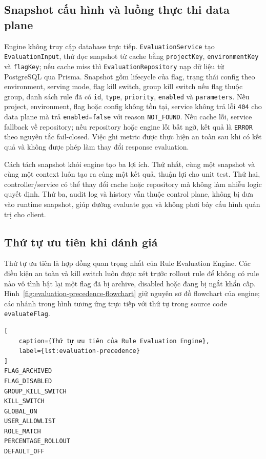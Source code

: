 \subsection{Snapshot cấu hình và luồng thực thi data plane}

Engine không truy cập database trực tiếp. \texttt{EvaluationService} tạo \texttt{EvaluationInput}, thử đọc snapshot từ cache bằng \texttt{projectKey}, \texttt{environmentKey} và \texttt{flagKey}; nếu cache miss thì \texttt{EvaluationRepository} nạp dữ liệu từ PostgreSQL qua Prisma. Snapshot gồm lifecycle của flag, trạng thái config theo environment, serving mode, flag kill switch, group kill switch nếu flag thuộc group, danh sách rule đã có \texttt{id}, \texttt{type}, \texttt{priority}, \texttt{enabled} và \texttt{parameters}. Nếu project, environment, flag hoặc config không tồn tại, service không trả lỗi \texttt{404} cho data plane mà trả \texttt{enabled=false} với reason \texttt{NOT\_FOUND}. Nếu cache lỗi, service fallback về repository; nếu repository hoặc engine lỗi bất ngờ, kết quả là \texttt{ERROR} theo nguyên tắc fail-closed. Việc ghi metric được thực hiện an toàn sau khi có kết quả và không được phép làm thay đổi response evaluation.

Cách tách snapshot khỏi engine tạo ba lợi ích. Thứ nhất, cùng một snapshot và cùng một context luôn tạo ra cùng một kết quả, thuận lợi cho unit test. Thứ hai, controller/service có thể thay đổi cache hoặc repository mà không làm nhiễu logic quyết định. Thứ ba, audit log và history vẫn thuộc control plane, không bị đưa vào runtime snapshot, giúp đường evaluate gọn và không phơi bày cấu hình quản trị cho client.

\subsection{Thứ tự ưu tiên khi đánh giá}

Thứ tự ưu tiên là hợp đồng quan trọng nhất của Rule Evaluation Engine. Các điều kiện an toàn và kill switch luôn được xét trước rollout rule để không có rule nào vô tình bật lại một flag đã bị archive, disabled hoặc đang bị ngắt khẩn cấp. Hình~\ref{fig:evaluation-precedence-flowchart} giữ nguyên sơ đồ flowchart của engine; các nhánh trong hình tương ứng trực tiếp với thứ tự trong source code \texttt{evaluateFlag}.

\begin{lstlisting}[
    caption={Thứ tự ưu tiên của Rule Evaluation Engine},
    label={lst:evaluation-precedence}
]
FLAG_ARCHIVED
FLAG_DISABLED
GROUP_KILL_SWITCH
KILL_SWITCH
GLOBAL_ON
USER_ALLOWLIST
ROLE_MATCH
PERCENTAGE_ROLLOUT
DEFAULT_OFF
\end{lstlisting}

